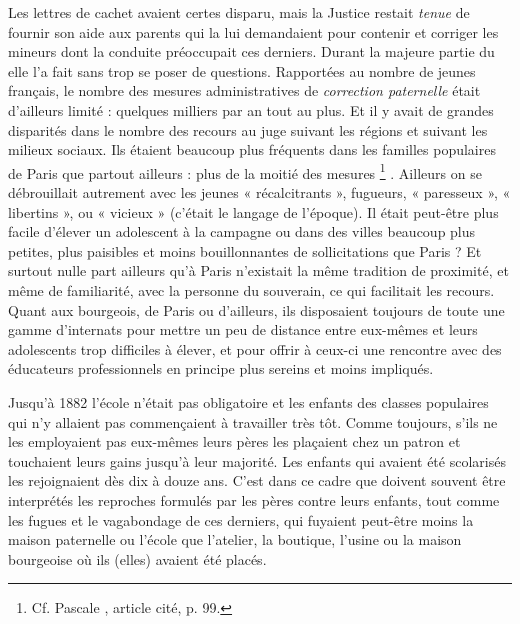  Les lettres de cachet avaient certes disparu, mais la Justice restait \emph{tenue} de fournir son aide aux parents qui la lui demandaient pour contenir et corriger les mineurs dont la conduite préoccupait ces derniers. Durant la majeure partie du  elle l'a fait sans trop se poser de questions. Rapportées au nombre de jeunes français, le nombre des mesures administratives de \emph{correction paternelle} était d'ailleurs limité : quelques milliers par an tout au plus. Et il y avait de grandes disparités dans le nombre des recours au juge suivant les régions et suivant les milieux sociaux. Ils étaient beaucoup plus fréquents dans les familles populaires de Paris que partout ailleurs : plus de la moitié des mesures%
\footnote{Cf. Pascale , article cité, p. 99.}%
. Ailleurs on se débrouillait autrement avec les jeunes « récalcitrants », fugueurs, « paresseux », « libertins », ou « vicieux » (c'était le langage de l'époque). Il était peut-être plus facile d'élever un adolescent à la campagne ou dans des villes beaucoup plus petites, plus paisibles et moins bouillonnantes de sollicitations que Paris ? Et surtout nulle part ailleurs qu'à Paris n'existait la même tradition de proximité, et même de familiarité, avec la personne du souverain, ce qui facilitait les recours. Quant aux bourgeois, de Paris ou d'ailleurs, ils disposaient toujours de toute une gamme d'internats pour mettre un peu de distance entre eux-mêmes et leurs adolescents trop difficiles à élever, et pour offrir à ceux-ci une rencontre avec des éducateurs professionnels en principe plus sereins et moins impliqués.

 Jusqu'à 1882 l'école n'était pas obligatoire et les enfants des classes populaires qui n'y allaient pas commençaient à travailler très tôt. Comme toujours, s'ils ne les employaient pas eux-mêmes leurs pères les plaçaient chez un patron et touchaient leurs gains jusqu'à leur majorité. Les enfants qui avaient été scolarisés les rejoignaient dès dix à douze ans. C'est dans ce cadre que doivent souvent être interprétés les reproches formulés par les pères contre leurs enfants, tout comme les fugues et le vagabondage de ces derniers, qui fuyaient peut-être moins la maison paternelle ou l'école que l'atelier, la boutique, l'usine ou la maison bourgeoise où ils (elles) avaient été placés.

